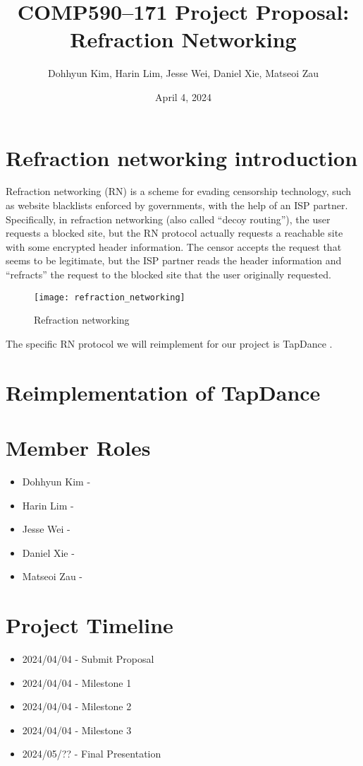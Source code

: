 \documentclass{article}
\title{COMP590--171 Project Proposal: Refraction Networking}
\author{Dohhyun Kim, Harin Lim, Jesse Wei, Daniel Xie, Matseoi Zau}
\date{April 4, 2024}
\begin{document}
\maketitle

\section{Refraction networking introduction}

Refraction networking (RN) is a scheme for evading censorship technology, such as website blacklists enforced by governments, with the help of an ISP partner. Specifically, in refraction networking (also called ``decoy routing''), the user requests a blocked site, but the RN protocol actually requests a reachable site with some encrypted header information. The censor accepts the request that seems to be legitimate, but the ISP partner reads the header information and ``refracts'' the request to the blocked site that the user originally requested.

\begin{figure}[h]
    \centering
    \texttt{[image: refraction\_networking]}
    \caption{Refraction networking \cite{refraction_network}}
\end{figure}

The specific RN protocol we will reimplement for our project is TapDance \cite{tapdance}.

\section{Reimplementation of TapDance}

\section{Member Roles}

\begin{itemize}
\item Dohhyun Kim - 
\item Harin Lim - 
\item Jesse Wei - 
\item Daniel Xie - 
\item Matseoi Zau - 
\end{itemize}

\section{Project Timeline}

\begin{itemize}
\item 2024/04/04 - Submit Proposal 
\item 2024/04/04 - Milestone 1 
\item 2024/04/04 - Milestone 2  
\item 2024/04/04 - Milestone 3  
\item 2024/05/?? - Final Presentation 
\end{itemize}

\newpage
\printbibliography
\end{document}
